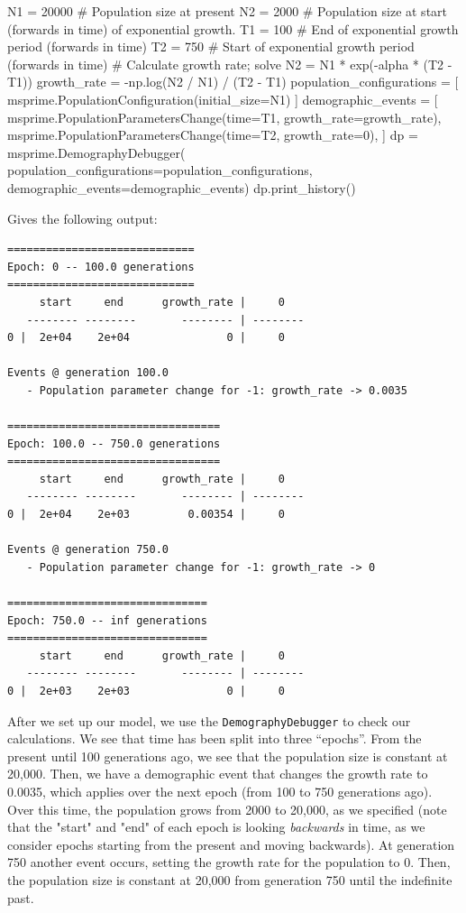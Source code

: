 \documentclass[graybox]{svmult}
\begin{document}
\begin{pythoncode}
N1 = 20000  # Population size at present
N2 = 2000   # Population size at start (forwards in time) of exponential growth.
T1 = 100    # End of exponential growth period (forwards in time)
T2 = 750    # Start of exponential growth period (forwards in time)
# Calculate growth rate; solve N2 = N1 * exp(-alpha * (T2 - T1))
growth_rate = -np.log(N2 / N1) / (T2 - T1)
population_configurations = [
    msprime.PopulationConfiguration(initial_size=N1)
]
demographic_events = [
    msprime.PopulationParametersChange(time=T1, growth_rate=growth_rate),
    msprime.PopulationParametersChange(time=T2, growth_rate=0),
]
dp = msprime.DemographyDebugger(
    population_configurations=population_configurations,
    demographic_events=demographic_events)
dp.print_history()
\end{pythoncode}

Gives the following output:
\begin{footnotesize}
\begin{verbatim}
=============================
Epoch: 0 -- 100.0 generations
=============================
     start     end      growth_rate |     0
   -------- --------       -------- | --------
0 |  2e+04    2e+04               0 |     0

Events @ generation 100.0
   - Population parameter change for -1: growth_rate -> 0.0035

=================================
Epoch: 100.0 -- 750.0 generations
=================================
     start     end      growth_rate |     0
   -------- --------       -------- | --------
0 |  2e+04    2e+03         0.00354 |     0

Events @ generation 750.0
   - Population parameter change for -1: growth_rate -> 0

===============================
Epoch: 750.0 -- inf generations
===============================
     start     end      growth_rate |     0
   -------- --------       -------- | --------
0 |  2e+03    2e+03               0 |     0

\end{verbatim}
\end{footnotesize}

    After we set up our model, we use the \texttt{DemographyDebugger} to
check our calculations. We see that time has been split into three
``epochs''. From the present until 100 generations ago, we see that the
population size is constant at 20,000. Then, we have a demographic event
that changes the growth rate to 0.0035, which applies over the next
epoch (from 100 to 750 generations ago). Over this time, the population
grows from 2000 to 20,000, as we specified (note that the "start" and
"end" of each epoch is looking \emph{backwards} in time, as we consider
epochs starting from the present and moving backwards). At generation
750 another event occurs, setting the growth rate for the population to
0. Then, the population size is constant at 20,000 from generation 750
until the indefinite past.
\end{document}
